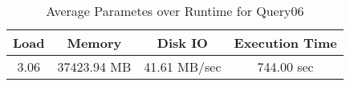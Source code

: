 \documentclass[../../main.tex]{subfiles}
\begin{document}
    \begin{table}
        \begin{center}
            \begin{tabular}{ |c|c|c|c| } 
            \hline
            Load & Memory & Disk IO & Execution Time\\
            \hline
            3.06 & 37423.94 MB & 41.61 MB/sec & 744.00 sec \\
            \hline
            \end{tabular}
            \\[1pt]
            \caption{Average Parametes over Runtime for Query06}
        \end{center}
    \end{table}
    \pagebreak
\end{document}
